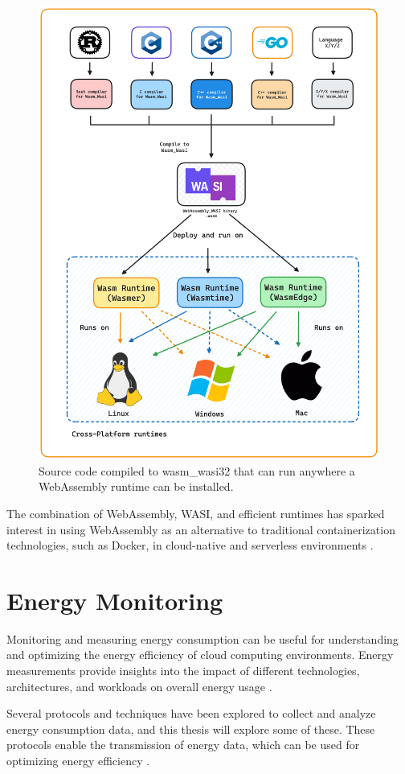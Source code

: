 \documentclass[
  table]{report}
\begin{document}
\begin{figure}[H]
\centering
  \includegraphics[width=0.7\columnwidth]{assets/3-wasm-runtime.png}
  \caption{Source code compiled to wasm\_wasi32 that can run anywhere
a WebAssembly runtime can be installed.}
  \label{fig:wasm-runtimes}
\end{figure}

The combination of WebAssembly, WASI, and efficient runtimes has sparked
interest in using WebAssembly as an alternative to traditional
containerization technologies, such as Docker, in cloud-native and
serverless environments \citep{shillakerFaasmLightweightIsolation2020a,
sebrechtsAdaptingKubernetesControllers2022}.

\section{Energy Monitoring}
\label{sect:energy_monitoring}

Monitoring and measuring energy consumption can be useful for
understanding and optimizing the energy efficiency of cloud computing
environments. Energy measurements provide insights into the impact of
different technologies, architectures, and workloads on overall energy
usage
\citep{shehabiUnitedStatesData2016, al-fuqahaInternetThingsSurvey2015}.

Several protocols and techniques have been explored to collect and
analyze energy consumption data, and this thesis will explore some of
these. These protocols enable the transmission of energy data, which can
be used for optimizing energy efficiency
\citep{al-fuqahaInternetThingsSurvey2015}.
\end{document}

